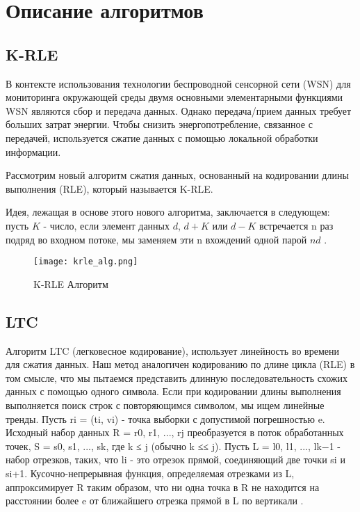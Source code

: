 \chapter{Описание алгоритмов}
\label{ch:chap1}

\section{K-RLE}

В контексте использования технологии беспроводной сенсорной сети
(WSN) для мониторинга окружающей среды двумя
основными элементарными функциями WSN являются сбор
и передача данных. Однако передача/прием данных
требует больших затрат энергии. Чтобы снизить энергопотребление, связанное с передачей, используется сжатие данных с помощью локальной обработки информации.

Рассмотрим новый алгоритм сжатия данных, основанный на кодировании длины выполнения (RLE), который называется K-RLE.

Идея, лежащая в основе этого нового алгоритма, заключается в следующем:
пусть $K$ - число, если элемент данных $d$, $d+K$ или $d-K$ встречается n раз подряд во входном потоке, мы заменяем эти n вхождений
одной парой $nd$ \cite{krle_article}.

\begin{figure}[ht]
    \centering
    \texttt{[image: krle\_alg.png]}
    \caption{K-RLE Алгоритм}
    \label{fig:krle_alg}
\end{figure}

\section{LTC}

Алгоритм LTC (легковесное кодирование), использует линейность во времени
для сжатия данных. Наш метод аналогичен кодированию по
длине цикла (RLE) в том смысле, что мы пытаемся
представить длинную последовательность схожих данных с
помощью одного символа. Если при кодировании длины выполнения выполняется поиск строк
с повторяющимся символом, мы ищем линейные тренды.
Пусть ri = (ti, vi) - точка выборки с допустимой
погрешностью e. Исходный набор данных R = r0, r1, ..., rj
преобразуется в поток обработанных точек, S =
s0, s1, ..., sk, где k ≤ j (обычно k ≤≤ j). Пусть
L = l0, l1, ..., lk−1 - набор отрезков, таких, что
li - это отрезок прямой, соединяющий две точки si и
si+1. Кусочно-непрерывная функция, определяемая
отрезками из L, аппроксимирует R таким образом, что ни одна точка в
R не находится на расстоянии более e от ближайшего
отрезка прямой в L по вертикали \cite{ltc_article}. \\

